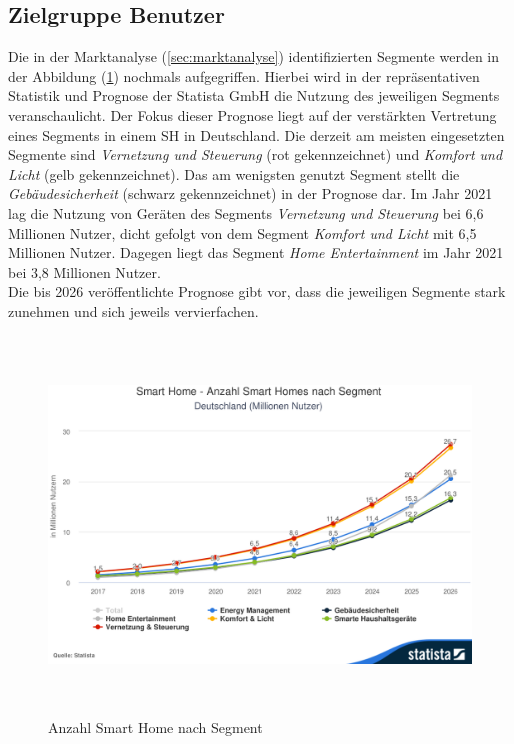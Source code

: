     \subsection{Zielgruppe Benutzer}
        Die in der Marktanalyse (\ref{sec:marktanalyse}) identifizierten Segmente werden in der Abbildung 
        (\ref{pic:segments}) nochmals aufgegriffen. Hierbei wird in der repräsentativen Statistik und Prognose der 
        Statista GmbH die Nutzung des jeweiligen Segments veranschaulicht. Der Fokus dieser Prognose liegt 
        auf der verstärkten Vertretung eines Segments in einem \acl{SH} in Deutschland. Die derzeit am meisten eingesetzten 
        Segmente sind \textit{Vernetzung und Steuerung} (rot gekennzeichnet) und \textit{Komfort und Licht} 
        (gelb gekennzeichnet). Das am wenigsten genutzt Segment stellt die \textit{Gebäudesicherheit} 
        (schwarz gekennzeichnet) in der Prognose dar. Im Jahr 2021 lag die Nutzung von Geräten des Segments \textit{Vernetzung 
        und Steuerung} bei 6,6 Millionen Nutzer, dicht gefolgt von dem Segment \textit{Komfort und Licht} mit 
        6,5 Millionen Nutzer. Dagegen liegt das Segment \textit{Home Entertainment} im Jahr 2021 bei 3,8 Millionen Nutzer.
        \\
        \linebreak
        Die bis 2026 veröffentlichte Prognose gibt vor, dass die jeweiligen Segmente stark zunehmen %
        und sich jeweils vervierfachen.  
        \pagebreak
        \begin{figure}[hbt!]
            \centering
            \includegraphics[width=15cm,height=10cm,keepaspectratio]{images/Statista-Outlook-Smart-Home---Anzahl-Smart-Homes-nach-Segment-Deutschland-Millionen-Nutzer.png}
            \caption{Anzahl Smart Home nach Segment \cite{statista2021}} 
            \label{pic:segments}
        \end{figure}
